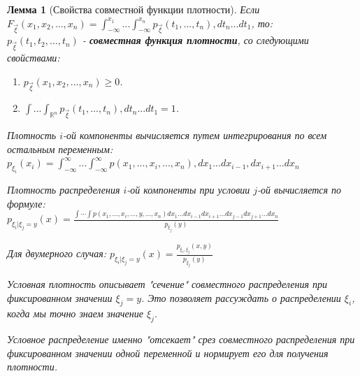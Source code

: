 \documentclass[14pt]{extarticle}
\theoremstyle{breakstyle}
\newtheorem{lemma}{Лемма}[subsection]
\begin{document}
\begin{lemma}[Свойства совместной функции плотности]

Если $F_{\vec{\xi}}(x_1, x_2, ..., x_n) = \int_{-\infty}^{x_1} ... \int_{-\infty}^{x_n} p_{\vec{\xi}}(t_1, ..., t_n) , dt_n ... dt_1$, то: \\

$p_{\vec{\xi}}(t_1, t_2, ..., t_n)$ - \textbf{совместная функция плотности}, со следующими свойствами:
\begin{enumerate}
    \item $p_{\vec{\xi}}(x_{1}, x_{2}, ..., x_{n}) \geq 0$.
    \item $\int ... \int_{\mathbb{R}^{n}} p_{\vec{\xi}}(t_1, ..., t_n) , dt_n ... dt_1 = 1$.
\end{enumerate}

\vspace{\baselineskip}

Плотность $i$-ой компоненты вычисляется путем интегрирования по всем остальным переменным: \\
$p_{\xi_{i}}(x_{i}) = \int_{-\infty}^{\infty} ... \int_{-\infty}^{\infty} p(x_1, ..., x_i, ..., x_n) , dx_1 ... dx_{i-1} , dx_{i+1} ... dx_n$

\vspace{\baselineskip}

Плотность распределения $i$-ой компоненты при условии $j$-ой вычисляется по формуле:\\
$p_{\xi_i|\xi_j=y}(x) = \frac{\int\cdots\int p(x_1,\ldots,x_i,\ldots,y,\ldots,x_n)dx_1\ldots dx_{i-1}dx_{i+1}\ldots dx_{j-1}dx_{j+1}\ldots dx_n}{p_{\xi_j}(y)}$

\vspace{\baselineskip}

Для двумерного случая: $p_{\xi_i|\xi_j=y}(x) = \frac{p_{\xi_i,\xi_j}(x,y)}{p_{\xi_j}(y)}$

\vspace{\baselineskip}

Условная плотность описывает "сечение" совместного распределения при фиксированном значении $\xi_{j} = y$. Это позволяет рассуждать о распределении $\xi_{i}$, когда мы точно знаем значение $\xi_{j}$.

\vspace{\baselineskip}

Условное распределение именно "отсекает" срез совместного распределения при фиксированном значении одной переменной и нормирует его для получения плотности.

\end{lemma}
\end{document}
